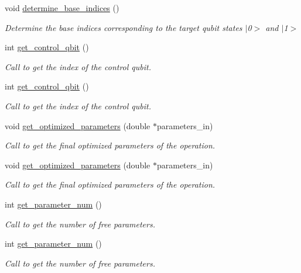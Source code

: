 \begin{DoxyCompactItemize}
void \hyperlink{class_u3_a046fa59a3a019a2d9cc6d30636c75148}{determine\+\_\+base\+\_\+indices} ()
\begin{DoxyCompactList}\small\item\em Determine the base indices corresponding to the target qubit states $\vert$0$>$ and $\vert$1$>$ \end{DoxyCompactList}\item 
int \hyperlink{class_operation_a2e9b60d334a0e0c99dede014ac989d0a}{get\+\_\+control\+\_\+qbit} ()
\begin{DoxyCompactList}\small\item\em Call to get the index of the control qubit. \end{DoxyCompactList}\item 
int \hyperlink{class_operation_a2e9b60d334a0e0c99dede014ac989d0a}{get\+\_\+control\+\_\+qbit} ()
\begin{DoxyCompactList}\small\item\em Call to get the index of the control qubit. \end{DoxyCompactList}\item 
void \hyperlink{class_u3_a7ebc4a0bf0eb7c4d37034d04ed787aaa}{get\+\_\+optimized\+\_\+parameters} (double $\ast$parameters\+\_\+in)
\begin{DoxyCompactList}\small\item\em Call to get the final optimized parameters of the operation. \end{DoxyCompactList}\item 
void \hyperlink{class_u3_a7ebc4a0bf0eb7c4d37034d04ed787aaa}{get\+\_\+optimized\+\_\+parameters} (double $\ast$parameters\+\_\+in)
\begin{DoxyCompactList}\small\item\em Call to get the final optimized parameters of the operation. \end{DoxyCompactList}\item 
int \hyperlink{class_operation_a670c1149cd1c675cf67bbcd861817223}{get\+\_\+parameter\+\_\+num} ()
\begin{DoxyCompactList}\small\item\em Call to get the number of free parameters. \end{DoxyCompactList}\item 
int \hyperlink{class_operation_a670c1149cd1c675cf67bbcd861817223}{get\+\_\+parameter\+\_\+num} ()
\begin{DoxyCompactList}\small\item\em Call to get the number of free parameters. \end{DoxyCompactList}\item 

\end{DoxyCompactItemize}
